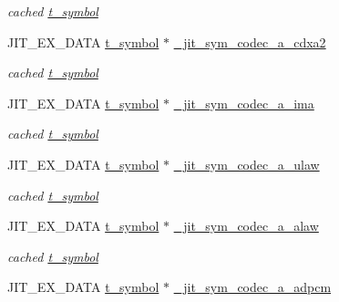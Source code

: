 \begin{DoxyCompactItemize}
\begin{DoxyCompactList}\small\item\em cached \hyperlink{structt__symbol}{t\_\-symbol} \item\end{DoxyCompactList}\item 
\hypertarget{group__jitter_ga87a941276047672ed71a74b2f384012f}{
JIT\_\-EX\_\-DATA \hyperlink{structt__symbol}{t\_\-symbol} $\ast$ \hyperlink{group__jitter_ga87a941276047672ed71a74b2f384012f}{\_\-jit\_\-sym\_\-codec\_\-a\_\-cdxa2}}
\label{group__jitter_ga87a941276047672ed71a74b2f384012f}

\begin{DoxyCompactList}\small\item\em cached \hyperlink{structt__symbol}{t\_\-symbol} \item\end{DoxyCompactList}\item 
\hypertarget{group__jitter_gaf7cfddd82a641fddeaca151ee909c2b0}{
JIT\_\-EX\_\-DATA \hyperlink{structt__symbol}{t\_\-symbol} $\ast$ \hyperlink{group__jitter_gaf7cfddd82a641fddeaca151ee909c2b0}{\_\-jit\_\-sym\_\-codec\_\-a\_\-ima}}
\label{group__jitter_gaf7cfddd82a641fddeaca151ee909c2b0}

\begin{DoxyCompactList}\small\item\em cached \hyperlink{structt__symbol}{t\_\-symbol} \item\end{DoxyCompactList}\item 
\hypertarget{group__jitter_ga2df564300a168369e9eec077ab672351}{
JIT\_\-EX\_\-DATA \hyperlink{structt__symbol}{t\_\-symbol} $\ast$ \hyperlink{group__jitter_ga2df564300a168369e9eec077ab672351}{\_\-jit\_\-sym\_\-codec\_\-a\_\-ulaw}}
\label{group__jitter_ga2df564300a168369e9eec077ab672351}

\begin{DoxyCompactList}\small\item\em cached \hyperlink{structt__symbol}{t\_\-symbol} \item\end{DoxyCompactList}\item 
\hypertarget{group__jitter_gaf46d5b8ae6489000faa04a78eb399e29}{
JIT\_\-EX\_\-DATA \hyperlink{structt__symbol}{t\_\-symbol} $\ast$ \hyperlink{group__jitter_gaf46d5b8ae6489000faa04a78eb399e29}{\_\-jit\_\-sym\_\-codec\_\-a\_\-alaw}}
\label{group__jitter_gaf46d5b8ae6489000faa04a78eb399e29}

\begin{DoxyCompactList}\small\item\em cached \hyperlink{structt__symbol}{t\_\-symbol} \item\end{DoxyCompactList}\item 
\hypertarget{group__jitter_ga1836652f8375090c81561194c38d8640}{
JIT\_\-EX\_\-DATA \hyperlink{structt__symbol}{t\_\-symbol} $\ast$ \hyperlink{group__jitter_ga1836652f8375090c81561194c38d8640}{\_\-jit\_\-sym\_\-codec\_\-a\_\-adpcm}}
\label{group__jitter_ga1836652f8375090c81561194c38d8640}


\end{DoxyCompactItemize}
